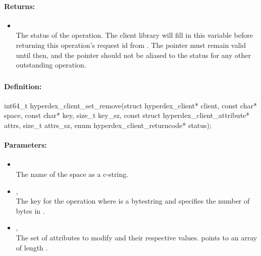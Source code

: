 \paragraph{Returns:}
\begin{itemize}[noitemsep]
\item {}\\
The status of the operation.  The client library will fill in this variable before returning this operation's request id from .  The pointer must remain valid until then, and the pointer should not be aliased to the status for any other outstanding operation.
\end{itemize}

\pagebreak
\subsubsection{}
\label{api:c:set_remove}


\paragraph{Definition:}
\begin{ccode}
int64_t hyperdex_client_set_remove(struct hyperdex_client* client,
        const char* space,
        const char* key, size_t key_sz,
        const struct hyperdex_client_attribute* attrs, size_t attrs_sz,
        enum hyperdex_client_returncode* status);
\end{ccode}

\paragraph{Parameters:}
\begin{itemize}[noitemsep]
\item {}\\
The name of the space as a c-string.
\item {}, \\
The key for the operation where  is a bytestring and  specifies the number of bytes in .
\item {}, \\
The set of attributes to modify and their respective values.   points to an array of length .
\end{itemize}

